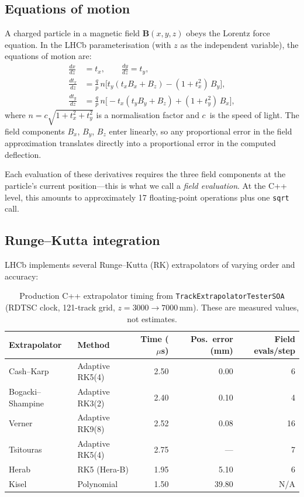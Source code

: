 \documentclass[11pt,a4paper]{article}
\begin{document}
\subsection{Equations of motion}

A charged particle in a magnetic field $\mathbf{B}(x,y,z)$ obeys the
Lorentz force equation.  In the LHCb parameterisation (with $z$ as the
independent variable), the equations of motion are:
\begin{align}
    \frac{dx}{dz} &= t_x, \qquad \frac{dy}{dz} = t_y, \\[4pt]
    \frac{dt_x}{dz} &= \frac{q}{p}\,n\bigl[
        t_y(t_x B_x + B_z) - (1+t_x^2)\,B_y
    \bigr], \label{eq:dtx} \\[4pt]
    \frac{dt_y}{dz} &= \frac{q}{p}\,n\bigl[
        -t_x(t_y B_y + B_z) + (1+t_y^2)\,B_x
    \bigr], \label{eq:dty}
\end{align}
where $n = c\sqrt{1 + t_x^2 + t_y^2}$ is a normalisation factor and
$c$~is the speed of light.  The field components $B_x$, $B_y$, $B_z$
enter linearly, so any proportional error in the field approximation
translates directly into a proportional error in the computed
deflection.

Each evaluation of these derivatives requires the three field
components at the particle's current position---this is what we call
a \emph{field evaluation}.  At the C++ level, this amounts to
approximately 17 floating-point operations plus one \texttt{sqrt} call.


\subsection{Runge--Kutta integration}

LHCb implements several Runge--Kutta (RK) extrapolators of varying
order and accuracy:

\begin{table}[htbp]
\centering
\caption{Production C++ extrapolator timing from
\texttt{TrackExtrapolatorTesterSOA} (RDTSC clock, 121-track grid,
$z = 3000 \to 7000$\,mm).  These are measured values, not estimates.}
\label{tab:prod}
\begin{tabular}{llrrr}
\toprule
Extrapolator & Method & Time ($\mu$s) & Pos.\ error (mm)
    & Field evals/step \\
\midrule
Cash--Karp & Adaptive RK5(4) & 2.50 & 0.00 & 6 \\
Bogacki--Shampine & Adaptive RK3(2) & 2.40 & 0.10 & 4 \\
Verner & Adaptive RK9(8) & 2.52 & 0.08 & 16 \\
Tsitouras & Adaptive RK5(4) & 2.75 & --- & 7 \\
Herab & RK5 (Hera-B) & 1.95 & 5.10 & 6 \\
Kisel & Polynomial & 1.50 & 39.80 & N/A \\
\bottomrule
\end{tabular}
\end{table}
\end{document}
